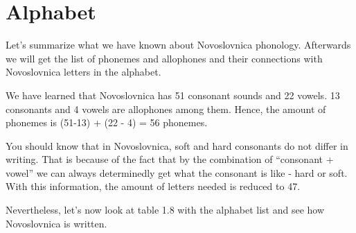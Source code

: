 \section{Alphabet}

Let’s summarize what we have known about Novoslovnica phonology. Afterwards we will get the list of phonemes and allophones and their connections with Novoslovnica letters in the alphabet.

We have learned that Novoslovnica has 51 consonant sounds and 22 vowels. 13 consonants and 4 vowels are allophones among them. Hence, the amount of phonemes is (51-13) + (22 - 4) = 56 phonemes.

You should know that in Novoslovnica, soft and hard consonants do not differ in writing. That is because of the fact that by the combination of “consonant + vowel” we can always determinedly get what the consonant is like - hard or soft. With this information, the amount of letters needed is reduced to 47.

Nevertheless, let’s now look at table 1.8 with the alphabet list and see how Novoslovnica is written.

